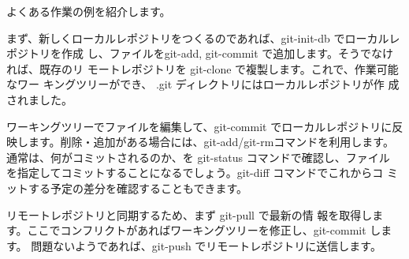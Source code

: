 \documentclass[mingoth,a4paper]{jsarticle}
\begin{document}
\begin{minipage}{0.5\hsize}
よくある作業の例を紹介します。

まず、新しくローカルレポジトリをつくるのであれば、git-init-db でローカルレポジトリを作成
し、ファイルをgit-add, git-commit で追加します。そうでなければ、既存のリ
モートレポジトリを git-clone で複製します。これで、作業可能なワー
キングツリーができ、 .git ディレクトリにはローカルレポジトリが作
成されました。

ワーキングツリーでファイルを編集して、git-commit でローカルレポジトリに反
映します。削除・追加がある場合には、git-add/git-rmコマンドを利用します。
通常は、何がコミットされるのか、を git-status コマンドで確認し、ファイル
を指定してコミットすることになるでしょう。git-diff コマンドでこれからコ
ミットする予定の差分を確認することもできます。

リモートレポジトリと同期するため、まず git-pull で最新の情
報を取得します。ここでコンフリクトがあればワーキングツリーを修正し、git-commit します。
問題ないようであれば、git-push でリモートレポジトリに送信します。
\end{minipage}
\end{document}
